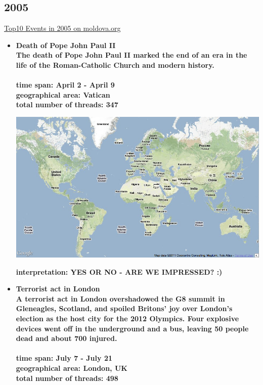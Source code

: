 \documentclass[11pt,a4paper,english]{article}
\begin{document}
			\subsection{2005}
			\href{http://politicom.moldova.org/news/10-most-important-world-events-of-2005-7712-eng.html}{Top10 Events in 2005 on moldova.org}
				\begin{itemize}
				\item \bf Death of Pope John Paul II\rm
					\\ The death of Pope John Paul II marked the end of an era in the life of the Roman-Catholic Church and modern history. 
					\\\\ \bf time span: \rm April 2 - April 9
					\\ \bf geographical area: \rm Vatican
					\\ \bf total number of threads: \rm 347
					
					\includegraphics[width=130mm]{img/2005-1}
						
					\bf interpretation: \rm YES OR NO - ARE WE IMPRESSED? :)
						


				\item \bf Terrorist act in London \rm
					\\ A terrorist act in London overshadowed the G8 summit in Gleneagles, Scotland, and spoiled Britons' joy over London's election as the host city for the 2012 Olympics. Four explosive devices went off in the underground and a bus, leaving 50 people dead and about 700 injured.
					\\\\ \bf time span: \rm July 7 - July 21
					\\ \bf geographical area: \rm London, UK
					\\ \bf total number of threads: \rm 498
					

\end{itemize}
\end{document}
